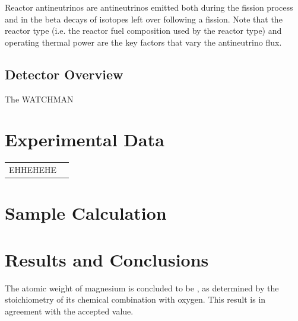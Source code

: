 \documentclass{article}
\begin{document}
Reactor antineutrinos are antineutrinos emitted both during the fission process
and in the beta decays of isotopes left over following a fission. 
Note that the reactor type (i.e. the reactor fuel composition used by the
reactor type) and operating thermal power are the key factors that vary
the antineutrino flux.


\subsection{Detector Overview}

The WATCHMAN



\section{Experimental Data}

\begin{tabular}{ll}
EHHEHEHE
\end{tabular}


\section{Sample Calculation}



\section{Results and Conclusions}

The atomic weight of magnesium is concluded to be , as determined by the stoichiometry of its chemical combination with oxygen. This result is in agreement with the accepted value.
\end{document}
